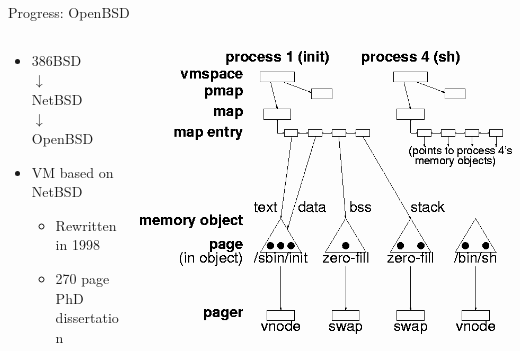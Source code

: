 \documentclass[aspectratio=169]{beamer}
\newcommand{\bi}{\begin{itemize}}
\newcommand{\ei}{\end{itemize}}
\begin{document}
\begin{frame}{Progress: OpenBSD}
  \begin{columns}[T]
    \begin{column}{0.4\textwidth}
      \bi
    \item 386BSD\\$\downarrow$\\NetBSD\\$\downarrow$\\OpenBSD
      \pause
    \item VM based on NetBSD
      \pause
      \bi
    \item Rewritten in 1998
      \pause
    \item 270 page PhD dissertation
      \pause
      \ei
      \ei
    \end{column}
    \begin{column}{0.6\textwidth}
      \includegraphics[scale=0.35]{./figures/uvm.png}
    \end{column}
  \end{columns}
\end{frame}
\end{document}
